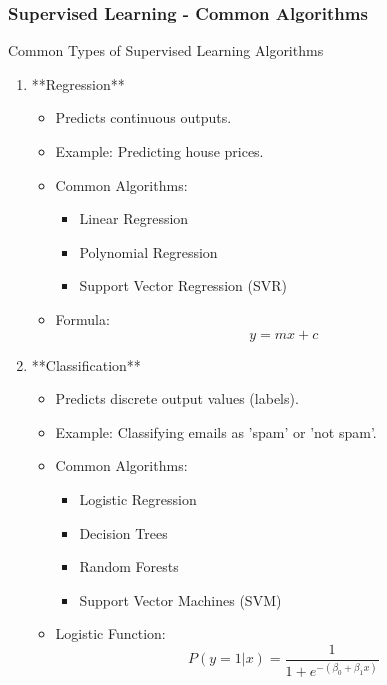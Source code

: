\documentclass[aspectratio=169]{beamer}
\begin{document}
\begin{frame}[fragile]
  \frametitle{Supervised Learning - Common Algorithms}
  \begin{block}{Common Types of Supervised Learning Algorithms}
    \begin{enumerate}
      \item **Regression**
        \begin{itemize}
          \item Predicts continuous outputs.
          \item Example: Predicting house prices.
          \item Common Algorithms: 
            \begin{itemize}
              \item Linear Regression
              \item Polynomial Regression
              \item Support Vector Regression (SVR)
            \end{itemize}
          \item Formula: 
          \begin{equation}
            y = mx + c
          \end{equation}
        \end{itemize}
      
      \item **Classification**
        \begin{itemize}
          \item Predicts discrete output values (labels).
          \item Example: Classifying emails as 'spam' or 'not spam'.
          \item Common Algorithms:
            \begin{itemize}
              \item Logistic Regression
              \item Decision Trees
              \item Random Forests
              \item Support Vector Machines (SVM)
            \end{itemize}
          \item Logistic Function:
          \begin{equation}
            P(y=1|x) = \frac{1}{1 + e^{-(\beta_0 + \beta_1 x)}}
          \end{equation}
        \end{itemize}
    \end{enumerate}
  \end{block}
\end{frame}
\end{document}
